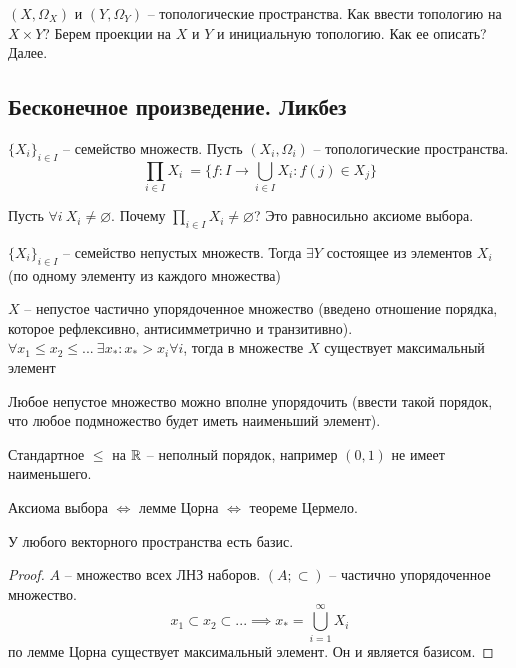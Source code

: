 \documentclass[main]{subfiles}
\begin{document}
\begin{example}
    $(X, \Omega_X)$ и $(Y, \Omega_Y)$ -- топологические пространства.
    Как ввести топологию на $X \times Y$?
    Берем проекции на $X$ и $Y$ и инициальную топологию.
    Как ее описать? Далее.
\end{example}

\subsection {Бесконечное произведение. Ликбез}

$\{X_i\}_{i \in I}$ -- семейство множеств.
Пусть $(X_i, \Omega_i)$ -- топологические пространства.
\[\prod_{i \in I} X_i\ = \{f: I \to \bigcup_{i \in I} X_i: f(j) \in X_j\}\]

Пусть $\forall i\ X_i \neq \varnothing$. Почему $\prod_{i \in I} X_i \neq \varnothing$?
Это равносильно аксиоме выбора.

\begin{axiom}[выбора]
    $\{X_i\}_{i \in I}$ -- семейство непустых множеств.
    Тогда $\exists Y$ состоящее из элементов $X_i$ (по одному элементу из каждого множества)
\end{axiom}
\begin{lemma}[Цорна]
    $X$ -- непустое частично упорядоченное множество (введено отношение порядка, которое рефлексивно, антисимметрично и транзитивно).
    $\forall x_1 \le x_2 \le ...\ \exists x_*: x_* > x_i \forall i$, тогда
    в множестве $X$ существует максимальный элемент
\end{lemma}
\begin{theorem}[Цермело]
    Любое непустое множество можно вполне упорядочить (ввести такой порядок, что любое подмножество будет иметь наименьший элемент).
\end{theorem}

Стандартное $\le$ на $\mathbb{R}$ -- неполный порядок, например $(0, 1)$ не имеет наименьшего.

\begin{assertion}
    Аксиома выбора $\Leftrightarrow$ лемме Цорна $\Leftrightarrow$ теореме Цермело.
\end{assertion}

\begin{theorem}
    У любого векторного пространства есть базис.
\end{theorem}
\begin{proof}
    $A$ -- множество всех ЛНЗ наборов. $(A; \subset )$ -- частично упорядоченное множество.
    \[x_1 \subset x_2 \subset ... \implies x_* = \bigcup_{i=1}^\infty X_i\]
    по лемме Цорна существует максимальный элемент. Он и является базисом.
\end{proof}
\end{document}
